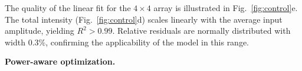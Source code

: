 The quality of the linear fit for the $4 \times 4$ array is illustrated in Fig.~\ref{fig:control}e. The total intensity (Fig.~\ref{fig:control}d) scales linearly with the average input amplitude, yielding $R^2 > 0.99$. Relative residuals are normally distributed with width $0.3\%$, confirming the applicability of the model in this range.

\textbf{Power-aware optimization.}

